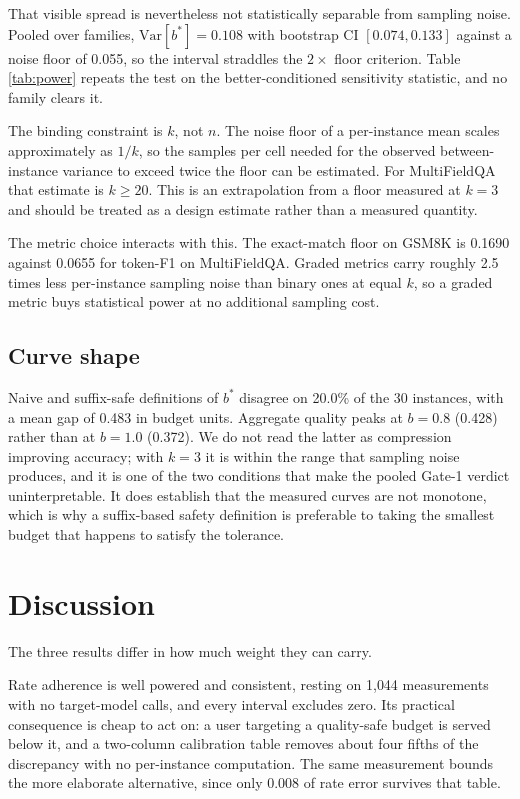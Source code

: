 \documentclass[conference]{IEEEtran}
\begin{document}
That visible spread is nevertheless not statistically separable from sampling
noise. Pooled over families, $\mathrm{Var}[b^{*}] = 0.108$ with bootstrap CI
$[0.074, 0.133]$ against a noise floor of 0.055, so the interval straddles the
$2\times$ floor criterion. Table \ref{tab:power} repeats the test on the
better-conditioned sensitivity statistic, and no family clears it.

The binding constraint is $k$, not $n$. The noise floor of a per-instance mean
scales approximately as $1/k$, so the samples per cell needed for the observed
between-instance variance to exceed twice the floor can be estimated. For
MultiFieldQA that estimate is $k \geq 20$. This is an extrapolation from a
floor measured at $k=3$ and should be treated as a design estimate rather than
a measured quantity.

The metric choice interacts with this. The exact-match floor on GSM8K is
0.1690 against 0.0655 for token-F1 on MultiFieldQA. Graded metrics carry
roughly 2.5 times less per-instance sampling noise than binary ones at equal
$k$, so a graded metric buys statistical power at no additional sampling cost.

\subsection{Curve shape}

Naive and suffix-safe definitions of $b^{*}$ disagree on 20.0\% of the 30
instances, with a mean gap of 0.483 in budget units. Aggregate quality peaks
at $b = 0.8$ (0.428) rather than at $b = 1.0$ (0.372). We do not read the
latter as compression improving accuracy; with $k=3$ it is within the range
that sampling noise produces, and it is one of the two conditions that make
the pooled Gate-1 verdict uninterpretable. It does establish that the measured
curves are not monotone, which is why a suffix-based safety definition is
preferable to taking the smallest budget that happens to satisfy the tolerance.

\section{Discussion}

The three results differ in how much weight they can carry.

Rate adherence is well powered and consistent, resting on 1{,}044 measurements
with no target-model calls, and every interval excludes zero. Its practical
consequence is cheap to act on: a user targeting a quality-safe budget is
served below it, and a two-column calibration table removes about four fifths
of the discrepancy with no per-instance computation. The same measurement
bounds the more elaborate alternative, since only 0.008 of rate error survives
that table.
\end{document}
